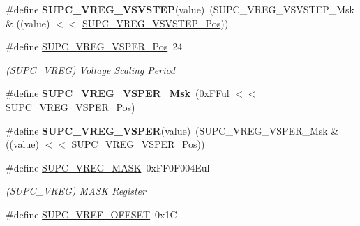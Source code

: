 \begin{DoxyCompactItemize}
\item 
\hypertarget{group___s_a_m_l21___s_u_p_c_ga157ea8a40998add370ab6994f0b87bc3}{}\#define {\bfseries S\+U\+P\+C\+\_\+\+V\+R\+E\+G\+\_\+\+V\+S\+V\+S\+T\+E\+P}(value)~(S\+U\+P\+C\+\_\+\+V\+R\+E\+G\+\_\+\+V\+S\+V\+S\+T\+E\+P\+\_\+\+Msk \& ((value) $<$$<$ \hyperlink{group___s_a_m_l21___s_u_p_c_ga731992afd40f5c78f4ff7843020a6f66}{S\+U\+P\+C\+\_\+\+V\+R\+E\+G\+\_\+\+V\+S\+V\+S\+T\+E\+P\+\_\+\+Pos}))\label{group___s_a_m_l21___s_u_p_c_ga157ea8a40998add370ab6994f0b87bc3}

\item 
\hypertarget{group___s_a_m_l21___s_u_p_c_gab46d7794eb9801eb6683c799a0fb9c00}{}\#define \hyperlink{group___s_a_m_l21___s_u_p_c_gab46d7794eb9801eb6683c799a0fb9c00}{S\+U\+P\+C\+\_\+\+V\+R\+E\+G\+\_\+\+V\+S\+P\+E\+R\+\_\+\+Pos}~24\label{group___s_a_m_l21___s_u_p_c_gab46d7794eb9801eb6683c799a0fb9c00}

\begin{DoxyCompactList}\small\item\em (S\+U\+P\+C\+\_\+\+V\+R\+E\+G) Voltage Scaling Period \end{DoxyCompactList}\item 
\hypertarget{group___s_a_m_l21___s_u_p_c_ga36637a2ddc7ad25ad8aeda88bac470a5}{}\#define {\bfseries S\+U\+P\+C\+\_\+\+V\+R\+E\+G\+\_\+\+V\+S\+P\+E\+R\+\_\+\+Msk}~(0x\+F\+Ful $<$$<$ S\+U\+P\+C\+\_\+\+V\+R\+E\+G\+\_\+\+V\+S\+P\+E\+R\+\_\+\+Pos)\label{group___s_a_m_l21___s_u_p_c_ga36637a2ddc7ad25ad8aeda88bac470a5}

\item 
\hypertarget{group___s_a_m_l21___s_u_p_c_gabc3f982814cb50855efb73657ba1d0f1}{}\#define {\bfseries S\+U\+P\+C\+\_\+\+V\+R\+E\+G\+\_\+\+V\+S\+P\+E\+R}(value)~(S\+U\+P\+C\+\_\+\+V\+R\+E\+G\+\_\+\+V\+S\+P\+E\+R\+\_\+\+Msk \& ((value) $<$$<$ \hyperlink{group___s_a_m_l21___s_u_p_c_gab46d7794eb9801eb6683c799a0fb9c00}{S\+U\+P\+C\+\_\+\+V\+R\+E\+G\+\_\+\+V\+S\+P\+E\+R\+\_\+\+Pos}))\label{group___s_a_m_l21___s_u_p_c_gabc3f982814cb50855efb73657ba1d0f1}

\item 
\hypertarget{group___s_a_m_l21___s_u_p_c_ga0abb6eb2870ec646e6723177c379bc76}{}\#define \hyperlink{group___s_a_m_l21___s_u_p_c_ga0abb6eb2870ec646e6723177c379bc76}{S\+U\+P\+C\+\_\+\+V\+R\+E\+G\+\_\+\+M\+A\+S\+K}~0x\+F\+F0\+F004\+Eul\label{group___s_a_m_l21___s_u_p_c_ga0abb6eb2870ec646e6723177c379bc76}

\begin{DoxyCompactList}\small\item\em (S\+U\+P\+C\+\_\+\+V\+R\+E\+G) M\+A\+S\+K Register \end{DoxyCompactList}\item 
\hypertarget{group___s_a_m_l21___s_u_p_c_gae0f1bf32312e0b14839e36f9b0550848}{}\#define \hyperlink{group___s_a_m_l21___s_u_p_c_gae0f1bf32312e0b14839e36f9b0550848}{S\+U\+P\+C\+\_\+\+V\+R\+E\+F\+\_\+\+O\+F\+F\+S\+E\+T}~0x1\+C\label{group___s_a_m_l21___s_u_p_c_gae0f1bf32312e0b14839e36f9b0550848}


\end{DoxyCompactItemize}

